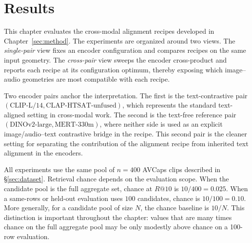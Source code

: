 %
%

\chapter{Results}
\label{sec:results}

This chapter evaluates the cross-modal alignment recipes developed in
Chapter~\ref{sec:method}. The experiments are organized around two
views. The \emph{single-pair} view fixes an encoder configuration and
compares recipes on the same input geometry. The \emph{cross-pair}
view sweeps the encoder cross-product and reports each recipe at its
configuration optimum, thereby exposing which image--audio geometries
are most compatible with each recipe.

Two encoder pairs anchor the interpretation. The first is the
text-contrastive pair
$(\text{CLIP-L/14}, \text{CLAP-HTSAT-unfused})$, which represents the
standard text-aligned setting in cross-modal work. The second is the
text-free reference pair
$(\text{DINOv2-large}, \text{MERT-330m})$, where neither side is used
as an explicit image/audio--text contrastive bridge in the recipe. This
second pair is the cleaner setting for separating the contribution of
the alignment recipe from inherited text alignment in the encoders.

All experiments use the same pool of $n=400$ AVCaps clips described in
\S\ref{sec:dataset}. Retrieval chance depends on the evaluation scope.
When the candidate pool is the full aggregate set, chance at $R@10$ is
$10/400 = 0.025$. When a same-rows or held-out evaluation uses $100$
candidates, chance is $10/100 = 0.10$. More generally, for a candidate
pool of size $N$, the chance baseline is $10/N$. This distinction is
important throughout the chapter: values that are many times chance on
the full aggregate pool may be only modestly above chance on a 100-row
evaluation.

